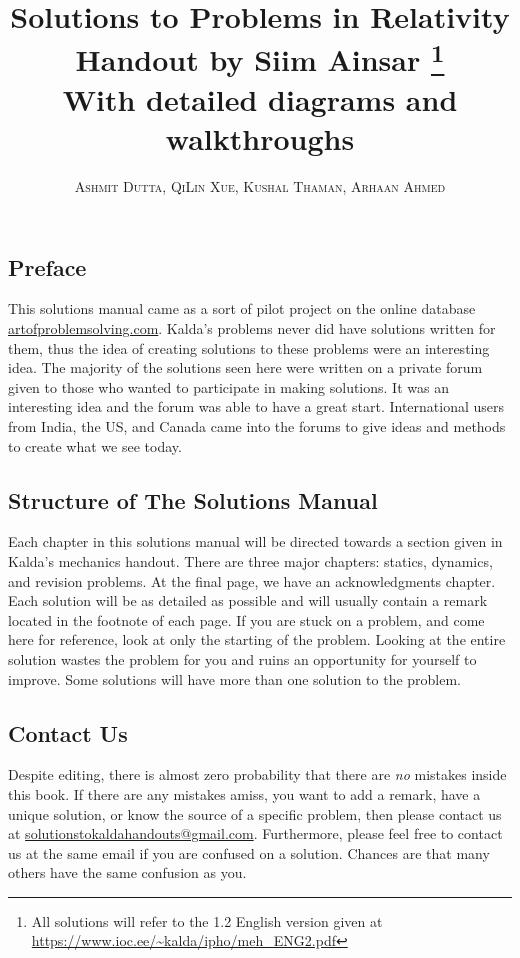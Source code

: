 \documentclass[a4paper,11pt]{article}
\title{\Huge \textbf{Solutions to Problems in Relativity Handout by Siim Ainsar \footnote{All solutions will refer to the 1.2 English version given at \newline\url{https://www.ioc.ee/~kalda/ipho/meh_ENG2.pdf}}} \\ \huge With detailed diagrams and walkthroughs}
\author{\textsc{Ashmit Dutta, QiLin Xue, Kushal Thaman, Arhaan Ahmed}}
\begin{document}
\maketitle

\subsection*{Preface}
\vspace{-5mm}

This solutions manual came as a sort of pilot project on the online database \url{artofproblemsolving.com}. Kalda's problems never did have solutions written for them, thus the idea of creating solutions to these problems were an interesting idea. The majority of the solutions seen here were written on a private forum given to those who wanted to participate in making solutions. It was an interesting idea and the forum was able to have a great start. International users from India, the US, and Canada came into the forums to give ideas and methods to create what we see today.

\subsection*{Structure of The Solutions Manual}
\vspace{-5mm}
Each chapter in this solutions manual will be directed towards a section given in Kalda's mechanics handout. There are three major chapters: statics, dynamics, and revision problems. At the final page, we have an acknowledgments chapter. Each solution will be as detailed as possible and will usually contain a remark located in the footnote of each page. If you are stuck on a problem, and come here for reference, look at only the starting of the problem. Looking at the entire solution wastes the problem for you and ruins an opportunity for yourself to improve. Some solutions will have more than one solution to the problem.

\subsection*{Contact Us}
\vspace{-5mm}
Despite editing, there is almost zero probability that there are \textit{no} mistakes inside this book. If there are any mistakes amiss, you want to add a remark, have a unique solution, or know the source of a specific problem, then please contact us at \url{solutionstokaldahandouts@gmail.com}. Furthermore, please feel free to contact us at the same email if you are confused on a solution. Chances are that many others have the same confusion as you.
\newpage
\end{document}
